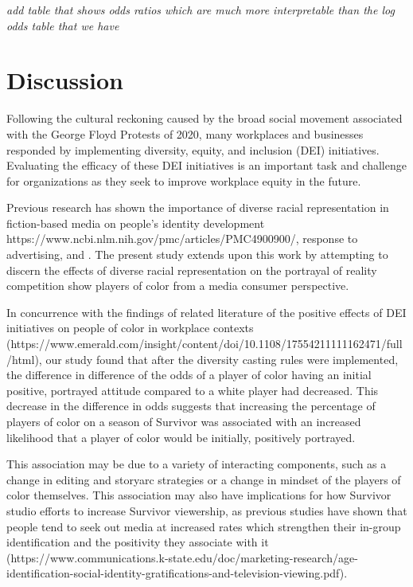 \documentclass[
  letterpaper,
  DIV=11,
  numbers=noendperiod,
  oneside]{scrartcl}
\begin{document}
\emph{add table that shows odds ratios which are much more interpretable
than the log odds table that we have}

\hypertarget{discussion}{%
\section{Discussion}\label{discussion}}

Following the cultural reckoning caused by the broad social movement
associated with the George Floyd Protests of 2020, many workplaces and
businesses responded by implementing diversity, equity, and inclusion
(DEI) initiatives. Evaluating the efficacy of these DEI initiatives is
an important task and challenge for organizations as they seek to
improve workplace equity in the future.

Previous research has shown the importance of diverse racial
representation in fiction-based media on people's identity development
https://www.ncbi.nlm.nih.gov/pmc/articles/PMC4900900/, response to
advertising, and . The present study extends upon this work by
attempting to discern the effects of diverse racial representation on
the portrayal of reality competition show players of color from a media
consumer perspective.

In concurrence with the findings of related literature of the positive
effects of DEI initiatives on people of color in workplace contexts
(https://www.emerald.com/insight/content/doi/10.1108/17554211111162471/full/html),
our study found that after the diversity casting rules were implemented,
the difference in difference of the odds of a player of color having an
initial positive, portrayed attitude compared to a white player had
decreased. This decrease in the difference in odds suggests that
increasing the percentage of players of color on a season of Survivor
was associated with an increased likelihood that a player of color would
be initially, positively portrayed.

This association may be due to a variety of interacting components, such
as a change in editing and storyarc strategies or a change in mindset of
the players of color themselves. This association may also have
implications for how Survivor studio efforts to increase Survivor
viewership, as previous studies have shown that people tend to seek out
media at increased rates which strengthen their in-group identification
and the positivity they associate with it
(https://www.communications.k-state.edu/doc/marketing-research/age-identification-social-identity-gratifications-and-television-viewing.pdf).
\end{document}
